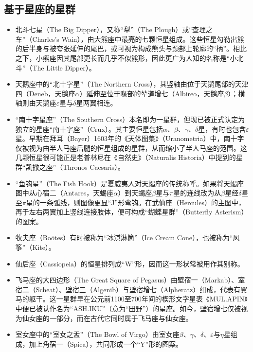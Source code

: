 \subsection{基于星座的星群}
\begin{itemize}
\item 北斗七星（The Big Dipper），又称“犁”（The Plough）或“查理之车”（Charles’s Wain），由大熊座中最亮的七颗恒星组成。这些恒星勾勒出熊的后半身与被夸张延伸的尾巴，或可视为构成熊头与颈部上轮廓的“柄”。相比之下，小熊座因其尾部更长而几乎不似熊形，因此更广为人知的名称是“小北斗”（The Little Dipper）。
\item 天鹅座中的“北十字星”（The Northern Cross），其竖轴由位于天鹅尾部的天津四（Deneb，天鹅座$\alpha$）延伸至位于喙部的辇道增七（Albireo，天鹅座$\beta$）；横轴则由天鹅座$\varepsilon$星与$\delta$星两翼相连。
\item “南十字星座”（The Southern Cross）本名即为一星群，但现已被正式认定为独立的星座“南十字座”（Crux）。其主要恒星包括$\alpha$、$\beta$、$\gamma$、$\delta$星，有时也包含$\varepsilon$星。早期在拜耳（Bayer）1603年的《天体图集》（Uranometria）中，南十字仅被视为由半人马座后腿的恒星组成的星群，从而缩小了半人马座的范围。这几颗恒星很可能正是老普林尼在《自然史》（Naturalis Historia）中提到的星群“凯撒之座”（Thronos Caesaris）。
\item “鱼钩星”（The Fish Hook）是夏威夷人对天蝎座的传统称呼。如果将天蝎座图中从心宿二（Antares，天蝎座$\alpha$）到天蝎座$\beta$星与$\pi$星的连线改为从$\beta$星经$\delta$星至$\pi$星的一条弧线，则图像更显“J”形弯钩。在武仙座（Hercules）的主图中，再于左右两翼加上竖线连接肢体，便可构成“蝴蝶星群”（Butterfly Asterism）的图案。
\item 牧夫座（Boötes）有时被称为“冰淇淋筒”（Ice Cream Cone），也被称为“风筝”（Kite）。
\item 仙后座（Cassiopeia）的恒星排列成“W”形，因而这一形状常被用作其别称。
\item 飞马座的大四边形（The Great Square of Pegasus）由壁宿一（Markab）、室宿二（Scheat）、壁宿三（Algenib）与壁宿增七（Alpheratz）组成，代表有翼马的躯干。这一星群早在公元前1100至700年间的楔形文字星表《MUL.APIN》中便已被认作名为“ASH.IKU”（意为“田野”）的星座。如今，壁宿增七仅被视为仙女座的一部分，而在古代它同时属于飞马座与仙女座。
\item 室女座中的“室女之盂”（The Bowl of Virgo）由室女座$\beta$、$\gamma$、$\delta$、$\varepsilon$与$\eta$星组成，加上角宿一（Spica），共同形成一个“Y”形的图案。
\end{itemize}

